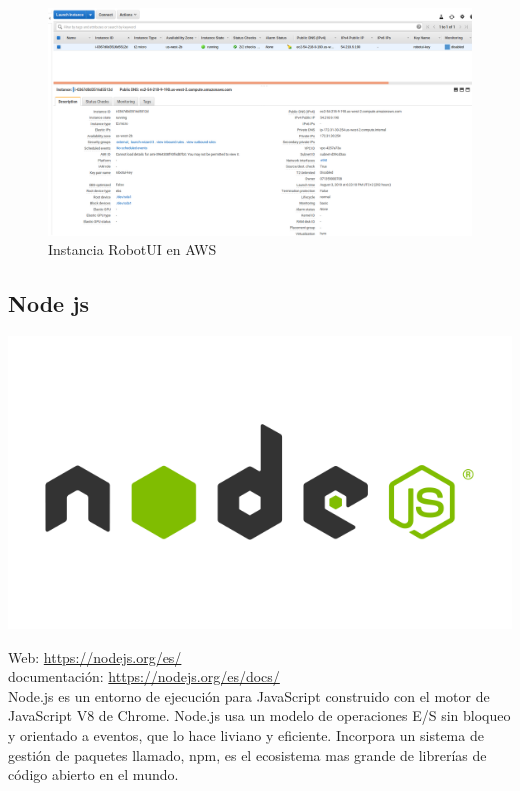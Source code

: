 \begin{figure}
\includegraphics[scale=0.3]{imagenes/aws_instance.png}
\caption{Instancia RobotUI en AWS}
\end{figure}


\subsection{Node js}

\begin{center}
\includegraphics[scale=0.3]{imagenes/nodejs-logo.png}
\end{center}

Web: \url{https://nodejs.org/es/}\\
documentación: \url{https://nodejs.org/es/docs/}\cite{website:4}\\

Node.js es un entorno de ejecución para JavaScript construido con el motor de JavaScript V8 de Chrome. Node.js usa un modelo de operaciones E/S sin bloqueo y orientado a eventos, que lo hace liviano y eficiente. Incorpora un sistema de gestión de paquetes llamado, npm, es el ecosistema mas grande de librerías de código abierto en el mundo.\\

